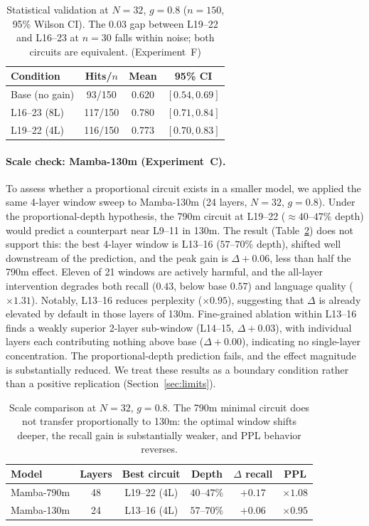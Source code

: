 \documentclass{article}
\begin{document}
\begin{table}[t]
\centering
\caption{Statistical validation at $N{=}32$, $g{=}0.8$ ($n{=}150$, 95\% Wilson CI).
The $0.03$ gap between L19--22 and L16--23 at $n{=}30$ falls within noise; both circuits
are equivalent. (Experiment~F)}
\label{tab:ci}
\begin{tabular}{lccc}
\toprule
Condition & Hits/$n$ & Mean & 95\% CI \\
\midrule
Base (no gain)  & 93/150  & 0.620 & $[0.54, 0.69]$ \\
L16--23 (8L)    & 117/150 & 0.780 & $[0.71, 0.84]$ \\
L19--22 (4L)    & 116/150 & 0.773 & $[0.70, 0.83]$ \\
\bottomrule
\end{tabular}
\end{table}

\paragraph{Scale check: Mamba-130m (Experiment~C).}
To assess whether a proportional circuit exists in a smaller model, we applied the
same 4-layer window sweep to Mamba-130m (24 layers, $N{=}32$, $g{=}0.8$). Under
the proportional-depth hypothesis, the 790m circuit at L19--22
(${\approx}40$--$47\%$ depth) would predict a counterpart near L9--11 in 130m.
The result (Table~\ref{tab:scale}) does not support this: the best 4-layer window
is L13--16 ($57$--$70\%$ depth), shifted well downstream of the prediction, and the
peak gain is $\Delta{+}0.06$, less than half the 790m effect. Eleven of 21
windows are actively harmful, and the all-layer intervention degrades both recall
($0.43$, below base $0.57$) and language quality ($\times 1.31$). Notably, L13--16
reduces perplexity ($\times 0.95$), suggesting that $\Delta$ is already elevated
by default in those layers of 130m. Fine-grained ablation within L13--16 finds a
weakly superior 2-layer sub-window (L14--15, $\Delta{+}0.03$), with individual
layers each contributing nothing above base ($\Delta{+}0.00$), indicating no
single-layer concentration. The proportional-depth prediction fails, and the effect
magnitude is substantially reduced. We treat these results as a boundary condition
rather than a positive replication (Section~\ref{sec:limits}).

\begin{table}[t]
\centering
\caption{Scale comparison at $N{=}32$, $g{=}0.8$. The 790m minimal circuit does
not transfer proportionally to 130m: the optimal window shifts deeper, the recall
gain is substantially weaker, and PPL behavior reverses.}
\label{tab:scale}
\begin{tabular}{lccccc}
\toprule
Model & Layers & Best circuit & Depth & $\Delta$ recall & PPL \\
\midrule
Mamba-790m & 48 & L19--22 (4L) & $40$--$47\%$ & $+0.17$ & $\times 1.08$ \\
Mamba-130m & 24 & L13--16 (4L) & $57$--$70\%$ & $+0.06$ & $\times 0.95$ \\
\bottomrule
\end{tabular}
\end{table}
\end{document}
